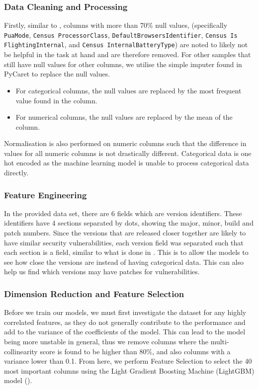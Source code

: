 \documentclass[pdflatex,sn-basic,10pt]{sn-jnl}%
\begin{document}
\subsubsection{Data Cleaning and Processing} 
Firstly, similar to \cite{shahini2019}, columns with more than 70\% null values, {(specifically \texttt{PuaMode}, \texttt{Census
ProcessorClass}, \texttt{DefaultBrowsersIdentifier}, \texttt{Census Is FlightingInternal}, and \texttt{Census InternalBatteryType})} are noted to likely not be helpful in the task at hand and are therefore removed.
For other samples that still have null values for other columns, we utilise the simple imputer found in PyCaret to replace the null values.

\begin{itemize}
    \item For categorical columns, the null values are replaced by the most frequent value found in the column.
    \item For numerical columns, the null values are replaced by the mean of the column.
\end{itemize}

Normalisation is also performed on numeric columns such that the difference in values for all numeric columns is not drastically different. Categorical data is one hot encoded as the machine learning model is unable to process categorical data directly.

\subsubsection{Feature Engineering} 
In the provided data set, there are 6 fields which are version identifiers.
These identifiers have 4 sections separated by dots, showing the major, minor, build and patch numbers.
Since the versions that are released closer together are likely to have similar security vulnerabilities, each version field was separated such that each section is a field, similar to what is done in \cite{iop2020}.
This is to allow the models to see how close the versions are instead of having categorical data.
This can also help us find which versions may have patches for vulnerabilities.

\subsubsection{Dimension Reduction and Feature Selection}
Before we train our models, we must first investigate the dataset for any highly correlated features, as they do not generally contribute to the performance and add to the variance of the coefficients of the model.
This can lead to the model being more unstable in general, thus we remove columns where the multi-collinearity score is found to be higher than 80\%, and also columns with a variance lower than 0.1. From here, we perform Feature Selection to select the 40 most important columns using the Light Gradient Boosting Machine (LightGBM) model (\cite{meng2016communication,ke2017lightgbm}).
\end{document}

